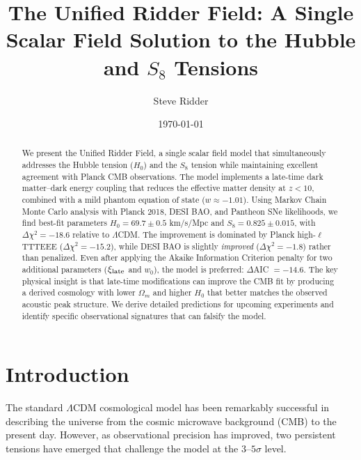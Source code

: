 \documentclass[twocolumn,showpacs,preprintnumbers,amsmath,amssymb,prd]{revtex4-2}
\begin{document}

\title{The Unified Ridder Field: A Single Scalar Field Solution to the Hubble and $S_8$ Tensions}

\author{Steve Ridder}

\date{\today}

\begin{abstract}
We present the Unified Ridder Field, a single scalar field model that simultaneously addresses the Hubble tension ($H_0$) and the $S_8$ tension while maintaining excellent agreement with Planck CMB observations. The model implements a late-time dark matter--dark energy coupling that reduces the effective matter density at $z < 10$, combined with a mild phantom equation of state ($w \approx -1.01$). Using Markov Chain Monte Carlo analysis with Planck 2018, DESI BAO, and Pantheon SNe likelihoods, we find best-fit parameters $H_0 = 69.7 \pm 0.5$ km/s/Mpc and $S_8 = 0.825 \pm 0.015$, with $\Delta\chi^2 = -18.6$ relative to $\Lambda$CDM. The improvement is dominated by Planck high-$\ell$ TTTEEE ($\Delta\chi^2 = -15.2$), while DESI BAO is slightly \textit{improved} ($\Delta\chi^2 = -1.8$) rather than penalized. Even after applying the Akaike Information Criterion penalty for two additional parameters ($\xi_{\rm late}$ and $w_0$), the model is preferred: $\Delta$AIC $= -14.6$. The key physical insight is that late-time modifications can improve the CMB fit by producing a derived cosmology with lower $\Omega_m$ and higher $H_0$ that better matches the observed acoustic peak structure. We derive detailed predictions for upcoming experiments and identify specific observational signatures that can falsify the model.
\end{abstract}

\maketitle

\section{Introduction}
\label{sec:intro}

The standard $\Lambda$CDM cosmological model has been remarkably successful in describing the universe from the cosmic microwave background (CMB) to the present day. However, as observational precision has improved, two persistent tensions have emerged that challenge the model at the $3$--$5\sigma$ level.
\end{document}
